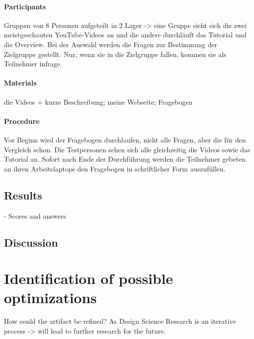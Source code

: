 \paragraph{Participants}
Gruppen von 8 Personen aufgeteilt in 2 Lager -> eine Gruppe sieht sich die zwei meistgeschauten YouTube-Videos an und die andere durchläuft das Tutorial und die Overview.
Bei der Auswahl werden die Fragen zur Bestimmung der Zielgruppe gestellt. Nur, wenn sie in die Zielgruppe fallen, kommen sie als Teilnehmer infrage.

\paragraph{Materials}
die Videos + kurze Beschreibung;
meine Webseite;
Fragebogen
\paragraph{Procedure}
Vor Beginn wird der Fragebogen durchlaufen, nicht alle Fragen, aber die für den Vergleich schon.
Die Testpersonen sehen sich alle gleichzeitig die Videos sowie das Tutorial an.
Sofort nach Ende der Durchführung werden die Teilnehmer gebeten an ihren Arbeitslaptops den Fragebogen in schriftlicher Form auszufüllen. 


\subsection{Results} \label{subsec:EvaluationResults}
- Scores and answers

\subsection{Discussion}

\section{Identification of possible optimizations} \label{sec:Optimizations}

How could the artifact be refined? As Design Science Research is an iterative process -> will lead to further research for the future.

